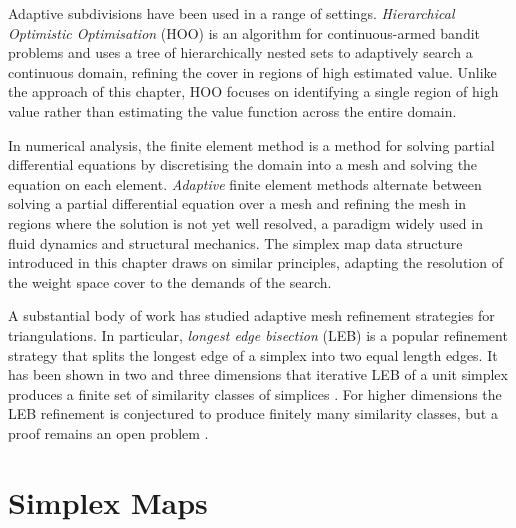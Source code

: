     Adaptive subdivisions have been used in a range of 
    settings. \textit{Hierarchical Optimistic Optimisation} (HOO) \cite{hoo} is an algorithm for continuous-armed bandit problems and uses a tree of 
    hierarchically nested sets to adaptively search a 
    continuous domain, refining the cover in regions of 
    high estimated value. Unlike the approach of this chapter, HOO focuses on identifying a single region of high value rather than estimating the value function across the entire domain.
    
    In numerical analysis, the finite element method \cite{fem} is a method for solving partial differential equations by discretising the domain into a mesh and solving the equation on each element. 
    \textit{Adaptive} finite element methods \cite{adaptive_fem} 
    alternate between solving a partial differential equation 
    over a mesh and refining the mesh in regions where the 
    solution is not yet well resolved, a paradigm widely 
    used in fluid dynamics and structural mechanics. The 
    simplex map data structure introduced in this chapter 
    draws on similar principles, adapting the resolution of 
    the weight space cover to the demands of the search.

    A substantial body of work has studied adaptive mesh refinement strategies for triangulations. In particular, \textit{longest edge bisection} (LEB) \cite{mesh_refine,simplex_refine} is a popular refinement strategy that splits the longest edge of a simplex into two equal length edges. It has been shown in two and three dimensions that iterative LEB of a unit simplex produces a finite set of similarity classes of simplices \cite{leb_2d_similarity_angle,leb_2d_similarity_general,leb_3d_similarity_general_nd_hypothesis}. For higher dimensions the LEB refinement is conjectured to produce finitely many similarity classes, but a proof remains an open problem \cite{leb_nd_regular_empirical}.













\section{Simplex Maps}
\label{sec:6-2-simplexmaps}

